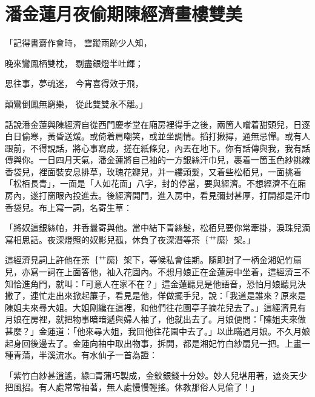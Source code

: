 %

\chapter{潘金蓮月夜偷期\KG 陳經濟畫樓雙美}

「記得書齋作會時，  雲蹤雨跡少人知，

晚來鸞鳳栖雙枕，  剔盡銀燈半吐輝；

思往事，夢魂迷，  今宵喜得效于飛，

顛鸞倒鳳無窮樂，  從此雙雙永不離。」

話說潘金蓮與陳經濟自從西門慶孝堂在廂房裡得手之後，兩箇人嚐着甜頭兒，日逐白日偷寒，黃昏送煖。或倚着肩嘲笑，或並坐調情。搯打揪撏，通無忌憚。或有人跟前，不得說話，將心事寫成，搓在紙條兒，內丟在地下。你有話傳與我，我有話傳與你。一日四月天氣，潘金蓮將自己袖的一方銀絲汗巾兒，裹着一箇玉色紗挑線香袋兒，裡面裝安息排草，玫瑰花瓣兒，并一縷頭髮，又着些松栢兒，一面挑着「松栢長青」，一面是「人如花面」八字，封的停當，要與經濟。不想經濟不在廂房內，遂打窗眼內投進去。後經濟開門，進入房中，看見彌封甚厚，打開都是汗巾香袋兒。布上寫一詞，名寄生草：

「將奴這銀絲帕，并香曩寄與他。當中結下青絲髮，松栢兒要你常牽掛，淚珠兒滴寫相思話。夜深燈照的奴影兒孤，休負了夜深潛等茶｛艹縻｝架。」

這經濟見詞上許他在荼｛艹縻｝架下，等候私會佳期。隨即封了一柄金湘妃竹扇兒，亦寫一詞在上面答他，袖入花園內。不想月娘正在金蓮房中坐着，這經濟三不知恰進角門，就叫：「可意人在家不在？」這金蓮聽見是他語音，恐怕月娘聽見決撒了，連忙走出來掀起簾子，看見是他，佯做擺手兒，說：「我道是誰來？原來是陳姐夫來尋大姐。大姐剛纔在這裡，和他們往花園亭子摘花兒去了。」這經濟見有月娘在房裡，就把物事暗暗遞與婦人袖了，他就出去了。月娘便問：「陳姐夫來做甚麼？」金蓮道：「他來尋大姐，我回他往花園中去了。」以此瞞過月娘。不久月娘起身回後邊去了。金蓮向袖中取出物事，拆開，都是湘妃竹白紗扇兒一把。上畫一種青蒲，半溪流水。有水仙子一首為證：

「紫竹白紗甚逍遙，綠□青蒲巧製成，金鉸銀錢十分妙。妙人兒堪用著，遮炎天少把風招。有人處常常袖著，無人處慢慢輕搖。休教那俗人見偷了！」

